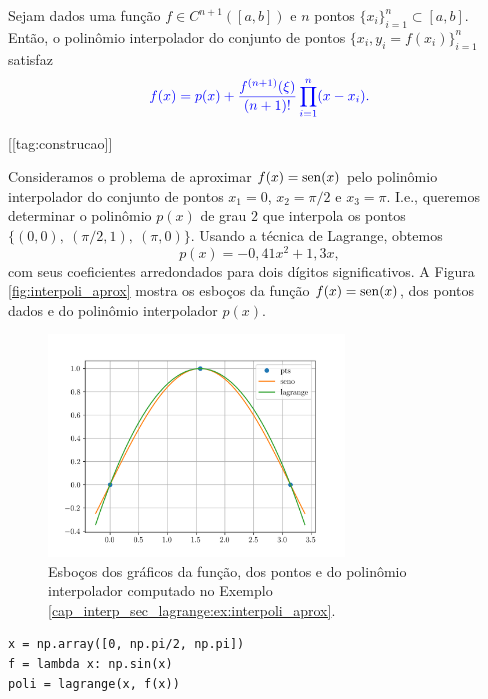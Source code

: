 \begin{teo}\label{cap_interp_sec_lagrange:teo:lagrange}
  Sejam dados uma função $f\in C^{n+1}([a, b])$ e $n$ pontos $\{x_i\}_{i=1}^n\subset [a, b]$. Então, o polinômio interpolador do conjunto de pontos $\{x_i, y_i=f(x_i)\}_{i=1}^n$ satisfaz
  \begin{equation}\color{blue}f(x) = p(x) + \frac{f^{(n+1)}(\xi)}{(n+1)!}\prod_{i=1}^n(x-x_i).
  \end{equation}
\end{teo}
\begin{dem}

  [[tag:construcao]]

\end{dem}

\begin{ex}\label{cap_interp_sec_lagrange:ex:interpoli_aprox}
  Consideramos o problema de aproximar $f(x) = \operatorname{sen}(x)$ pelo polinômio interpolador do conjunto de pontos $x_1=0$, $x_2=\pi/2$ e $x_3=\pi$. I.e., queremos determinar o polinômio $p(x)$ de grau $2$ que interpola os pontos $\{(0, 0),~(\pi/2, 1),~(\pi, 0)\}$. Usando a técnica de Lagrange, obtemos
  \begin{equation}
    p(x) = -0,41x^2 + 1,3x,
  \end{equation}
com seus coeficientes arredondados para dois dígitos significativos. A Figura \ref{fig:interpoli_aprox} mostra os esboços da função $f(x)=\operatorname{sen}(x)$, dos pontos dados e do polinômio interpolador $p(x)$.

\begin{figure}[H]
  \centering
  \includegraphics[width=0.7\textwidth]{./cap_interp/dados/fig_poliLagrange/fig}
  \caption{Esboços dos gráficos da função, dos pontos e do polinômio interpolador computado no Exemplo \ref{cap_interp_sec_lagrange:ex:interpoli_aprox}.}
  \label{cap_interp_sec_lagrange:fig:interpoli_aprox}
\end{figure}

\begin{lstlisting}
x = np.array([0, np.pi/2, np.pi])
f = lambda x: np.sin(x)
poli = lagrange(x, f(x))
\end{lstlisting}
\end{ex}

